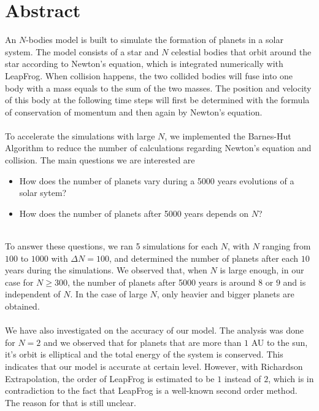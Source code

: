 \section*{Abstract}
An $N$-bodies model is built to simulate the formation of planets in a solar system. The model consists of a star and $N$ celestial bodies that orbit around the star according to Newton's equation, which is integrated numerically with LeapFrog. When collision happens, the two collided bodies will fuse into one body with a mass equals to the sum of the two masses. The position and velocity of this body at the following time steps will first be determined with the formula of conservation of momentum and then again by Newton's equation.\\
\\
To accelerate the simulations with large $N$, we implemented the Barnes-Hut Algorithm to reduce the number of calculations regarding Newton's equation and collision. The main questions we are interested are
\begin{itemize}
\item How does the number of planets vary during a 5000 years evolutions of a solar sytem?

\item How does the number of planets after 5000 years depends on $N$?
\end{itemize}
\leavevmode
\\
To answer these questions, we ran 5 simulations for each $N$, with $N$ ranging from $100$ to $1000$ with $\Delta N=100$, and determined the number of planets after each $10$ years during the simulations. We observed that, when $N$ is large enough, in our case for $N\geq 300$, the number of planets after 5000 years is around $8$ or $9$ and is independent of $N$. In the case of large $N$, only heavier and bigger planets are obtained.\\
\\
We have also investigated on the accuracy of our model. The analysis was done for $N=2$ and we observed that for planets that are more than $1$ AU to the sun, it's orbit is elliptical and the total energy of the system is conserved. This indicates that our model is accurate at certain level. However, with Richardson Extrapolation, the order of LeapFrog is estimated to be $1$ instead of $2$, which is in contradiction to the fact that LeapFrog is a well-known second order method. The reason for that is still unclear.
